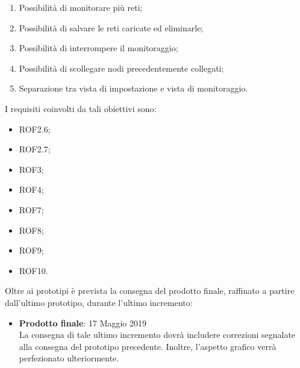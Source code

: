 \begin{itemize}
\begin{enumerate}
		\item Possibilità di monitorare più reti;
		\item Possibilità di salvare le reti caricate ed eliminarle;
		\item Possibilità di interrompere il monitoraggio;
		\item Possibilità di scollegare nodi precedentemente collegati;
		\item Separazione tra vista di impostazione e vista di monitoraggio.
	\end{enumerate}
	I requisiti coinvolti da tali obiettivi sono:
	\begin{itemize}
		\item ROF2.6;
		\item ROF2.7;
		\item ROF3;
		\item ROF4;
		\item ROF7;
		\item ROF8;
		\item ROF9;
		\item ROF10.
	\end{itemize}
\end{itemize}
Oltre ai prototipi è prevista la consegna del prodotto finale, raffinato a partire dall'ultimo prototipo, durante l'ultimo incremento:
\begin{itemize}
	\item \textbf{Prodotto finale}: 17 Maggio 2019\\
	La consegna di tale ultimo incremento dovrà includere correzioni segnalate alla consegna del prototipo precedente. Inoltre, l'aspetto grafico verrà perfezionato ulteriormente.
\end{itemize}



